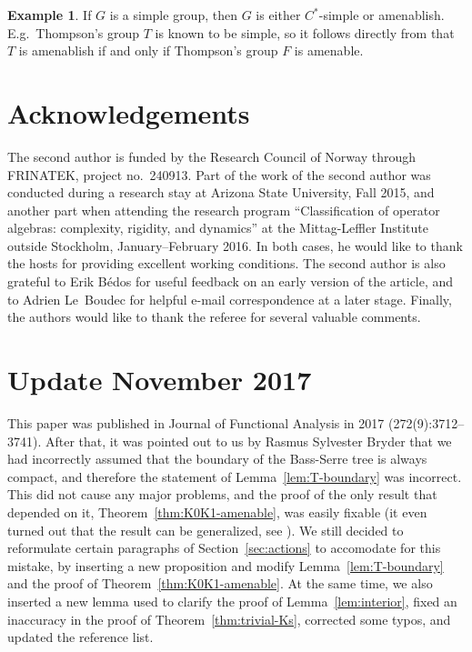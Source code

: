 \documentclass[a4paper]{amsart}
\theoremstyle{plain}
\theoremstyle{definition}
\newtheorem{example}[theorem]{Example}
\theoremstyle{remark}
\numberwithin{theorem}{section}
\begin{document}
\begin{example}
If $G$ is a simple group, then $G$ is either $C^*$-simple or amenablish.
E.g.\ Thompson's group $T$ is known to be simple,
so it follows directly from \cite{Boudec-Bon,Haagerup-Olesen} that $T$ is amenablish if and only if Thompson's group $F$ is amenable.
\end{example}


\section*{Acknowledgements}

The second author is funded by the Research Council of Norway through FRINATEK, project no.~240913.
Part of the work of the second author was conducted during a research stay at Arizona State University, Fall 2015,
and another part when attending the research program ``Classification of operator algebras: complexity, rigidity, and dynamics''
at the Mittag-Leffler Institute outside Stockholm, January--February 2016.
In both cases, he would like to thank the hosts for providing excellent working conditions.
The second author is also grateful to Erik B\'edos for useful feedback on an early version of the article,
and to Adrien Le~Boudec for helpful e-mail correspondence at a later stage.
Finally, the authors would like to thank the referee for several valuable comments.

\section*{Update November 2017}

This paper was published in Journal of Functional Analysis in 2017 (272(9):3712--3741).
After that, it was pointed out to us by Rasmus Sylvester Bryder that we had incorrectly assumed that the boundary of the Bass-Serre tree is always compact,
and therefore the statement of Lemma~\ref{lem:T-boundary} was incorrect.
This did not cause any major problems, and the proof of the only result that depended on it, Theorem~\ref{thm:K0K1-amenable},
was easily fixable (it even turned out that the result can be generalized, see \cite[Theorem~3.9]{BIO}).
We still decided to reformulate certain paragraphs of Section~\ref{sec:actions} to accomodate for this mistake,
by inserting a new proposition and modify Lemma~\ref{lem:T-boundary} and the proof of Theorem~\ref{thm:K0K1-amenable}.
At the same time, we also inserted a new lemma used to clarify the proof of Lemma~\ref{lem:interior},
fixed an inaccuracy in the proof of Theorem~\ref{thm:trivial-Ks}, corrected some typos, and updated the reference list.
\end{document}
